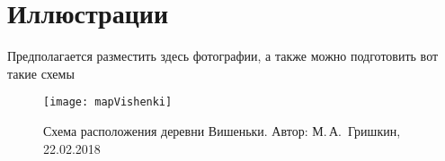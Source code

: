 ﻿\section{Иллюстрации}
Предполагается разместить здесь фотографии, а также можно подготовить вот такие схемы

\begin{figure}[h]
\texttt{[image: mapVishenki]}
\caption{Схема расположения деревни Вишеньки. Автор: М.\,А.~Гришкин, 22.02.2018}
\label{fig:mapVishenki}
\end{figure}

